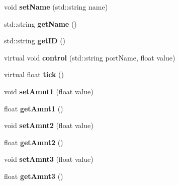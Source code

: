 \begin{DoxyCompactItemize}
\item 
\hypertarget{classunit_1_1UGen_a0a6939e0b4f246b671ef7990217d82ab}{void {\bfseries set\-Name} (std\-::string name)}\label{classunit_1_1UGen_a0a6939e0b4f246b671ef7990217d82ab}

\item 
\hypertarget{classunit_1_1UGen_adfb82e003597ca4876f803f0395b28d6}{std\-::string {\bfseries get\-Name} ()}\label{classunit_1_1UGen_adfb82e003597ca4876f803f0395b28d6}

\item 
\hypertarget{classunit_1_1UGen_a500ba300703167f4daa52b51841edf24}{std\-::string {\bfseries get\-I\-D} ()}\label{classunit_1_1UGen_a500ba300703167f4daa52b51841edf24}

\item 
\hypertarget{classunit_1_1UGen_a456a55e23a073bc77135525be38ad0eb}{virtual void {\bfseries control} (std\-::string port\-Name, float value)}\label{classunit_1_1UGen_a456a55e23a073bc77135525be38ad0eb}

\item 
\hypertarget{classunit_1_1UGen_a7fe124a01b35094197816cb8aa033c55}{virtual float {\bfseries tick} ()}\label{classunit_1_1UGen_a7fe124a01b35094197816cb8aa033c55}

\item 
\hypertarget{classunit_1_1UGen_a5063e6854f054cf7870abf1fdcbf8e30}{void {\bfseries set\-Amnt1} (float value)}\label{classunit_1_1UGen_a5063e6854f054cf7870abf1fdcbf8e30}

\item 
\hypertarget{classunit_1_1UGen_a98614bdc04b7c096fa7a75e486898947}{float {\bfseries get\-Amnt1} ()}\label{classunit_1_1UGen_a98614bdc04b7c096fa7a75e486898947}

\item 
\hypertarget{classunit_1_1UGen_a13494a4d13ad1fd32d16d5d22c22fb6d}{void {\bfseries set\-Amnt2} (float value)}\label{classunit_1_1UGen_a13494a4d13ad1fd32d16d5d22c22fb6d}

\item 
\hypertarget{classunit_1_1UGen_aa051f663b3fd0568eae2cad11b69058c}{float {\bfseries get\-Amnt2} ()}\label{classunit_1_1UGen_aa051f663b3fd0568eae2cad11b69058c}

\item 
\hypertarget{classunit_1_1UGen_aad0a3b7250c400216930062d651a1cf4}{void {\bfseries set\-Amnt3} (float value)}\label{classunit_1_1UGen_aad0a3b7250c400216930062d651a1cf4}

\item 
\hypertarget{classunit_1_1UGen_ac884f3a8cd1886698a9e2745940b9e1a}{float {\bfseries get\-Amnt3} ()}\label{classunit_1_1UGen_ac884f3a8cd1886698a9e2745940b9e1a}


\end{DoxyCompactItemize}
